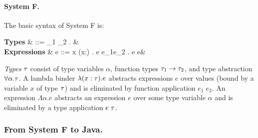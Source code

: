 \paragraph{System F.}
The basic syntax of System F is:


    \textbf{Types} & \type  ::=  \alpha \mid \type_1 \arrow \type_2
    \mid \forall \alpha. \type & \\
	\textbf{Expressions} & e  ::=  x \mid \lambda (x:\type) . e \mid e_1\;e_2 \mid \Lambda \alpha . e \mid e\;\type &
\ea
\eda

\noindent \emph{Types} $\tau$ consist of type variables $\alpha$,
function types $\tau_1 \rightarrow \tau_2$, and type abstraction $\forall
\alpha. \tau$. A lambda binder $\lambda (x:\tau) . e$ abstracts
expressions $e$ over values (bound by a variable $x$ of type $\tau$)
and is eliminated by function application $e_1\;e_2$. An expression
$\Lambda \alpha . e$ abstracts an expression $e$ over some type
variable $\alpha$ and is eliminated by a type application $e\;\tau$.

\subsubsection{From System F to Java.}

